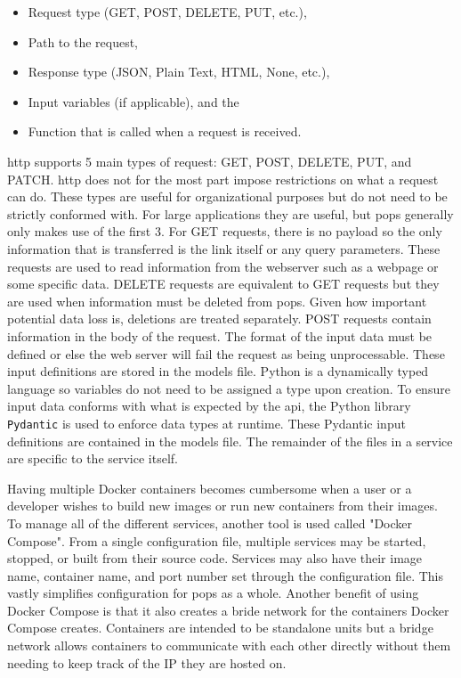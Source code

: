 \begin{itemize}
    \item Request type (GET, POST, DELETE, PUT, etc.), 
    \item Path to the request, 
    \item Response type (JSON, Plain Text, HTML, None, etc.), 
    \item Input variables (if applicable), and the 
    \item Function that is called when a request is received.
\end{itemize}

\gls{http} supports 5 main types of request: GET, POST, DELETE, PUT, and PATCH.
\gls{http} does not for the most part impose restrictions on what a request can
do. These types are useful for organizational purposes but do not need to be
strictly conformed with. For large applications they are useful, but \gls{pops}
generally only makes use of the first 3.  For GET requests, there is no payload
so the only information that is transferred is the link itself or any query
parameters.  These requests are used to read information from the webserver
such as a webpage or some specific data. DELETE requests are equivalent to GET
requests but they are used when information must be deleted from \gls{pops}.
Given how important potential data loss is, deletions are treated separately.
POST requests contain information in the body of the request.  The format of
the input data must be defined or else the web server will fail the request as
being unprocessable.  These input definitions are stored in the models file.
Python is a dynamically typed language so variables do not need to be assigned
a type upon creation. To ensure input data conforms with what is expected by
the \gls{api}, the Python library \texttt{Pydantic} is used to enforce data
types at runtime.  These Pydantic input definitions are contained in the models
file.  The remainder of the files in a service are specific to the service
itself.

Having multiple Docker containers becomes cumbersome when a user or a developer
wishes to build new images or run new containers from their images. To manage
all of the different services, another tool is used called "Docker Compose".
From a single configuration file, multiple services may be started, stopped, or
built from their source code. Services may also have their image name,
container name, and port number set through the configuration file. This vastly
simplifies configuration for \gls{pops} as a whole. Another benefit of using
Docker Compose is that it also creates a bride network for the containers
Docker Compose creates. Containers are intended to be standalone units but a
bridge network allows containers to communicate with each other directly
without them needing to keep track of the IP they are hosted on.

